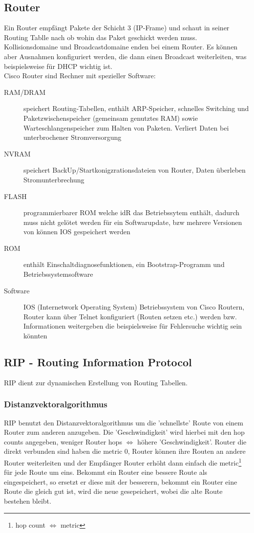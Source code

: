 \documentclass[a4paper,10pt]{scrartcl}
\begin{document}
            \subsection{Router}
                Ein Router empfängt Pakete der Schicht 3 (IP-Frame) und schaut in seiner Routing Tablle nach ob wohin das Paket geschickt werden muss. Kollisionsdomaine und Broadcastdomaine
                enden bei einem Router. Es können aber Ausnahmen konfiguriert werden, die dann einen Broadcast weiterleiten, was beispielsweise für DHCP wichtig ist. \\
                Cisco Router sind Rechner mit spezieller Software: 
                \begin{description}
                    \item[RAM/DRAM] speichert Routing-Tabellen, enthält ARP-Speicher, schnelles Switching und Paketzwischenspeicher (gemeinsam genutztes RAM) sowie Warteschlangenspeicher zum Halten
                    von Paketen. Verliert Daten bei unterbrochener Stromversorgung
                    \item[NVRAM] speichert BackUp/Startkonigzrationsdateien von Router, Daten überleben Stromunterbrechung
                    \item[FLASH] programmierbarer ROM welche idR das Betriebssytem enthält, dadurch muss nicht gelötet werden für ein Softwarupdate, bzw mehrere Versionen von können IOS gespeichert werden
                    \item[ROM] enthält Einschaltdiagnosefunktionen, ein Bootstrap-Programm und Betriebssystemsoftware
                    \item[Software] IOS (Internetwork Operating System) Betriebssystem von Cisco Routern, Router kann über Telnet konfiguriert (Routen setzen etc.) werden bzw. 
                        Informationen weitergeben die beispielsweise für Fehlersuche wichtig sein könnten
                \end{description}

            \subsection{RIP - Routing Information Protocol}
                RIP dient zur dynamischen Erstellung von Routing Tabellen.
                \subsubsection{Distanzvektoralgorithmus}
                    RIP benutzt den Distanzvektoralgorithmus um die 'schnellste' Route von einem Router zum anderen anzugeben. Die 'Geschwindigkeit' wird hierbei mit den hop counts angegeben,
                    weniger Router hops $\Leftrightarrow$ höhere 'Geschwindigkeit'. Router die direkt verbunden sind haben die metric 0, Router können ihre Routen an andere Router weiterleiten und
                    der Empfänger Router erhöht dann einfach die metric\footnote{hop count $\Leftrightarrow$ metric} für jede Route um eins.
                    Bekommt ein Router eine bessere Route als eingespeichert, so ersetzt er diese mit der besserern, bekommt ein Router eine Route die gleich gut ist, wird die neue gesepeichert, wobei die alte Route bestehen bleibt. 
\end{document}
